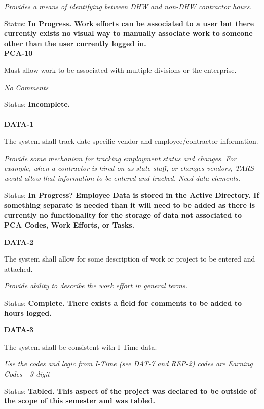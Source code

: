 \noindent \textit{Provides a means of identifying between DHW and non-DHW contractor hours.}

\noindent Status: \textbf{In Progress.   Work efforts can be associated to a user but there currently exists no visual way to manually associate work to someone other than the user currently logged in.}\\


\noindent \textbf{PCA-10}

\noindent Must allow work to be associated with multiple divisions or the enterprise.

\textit{No Comments}

 Status: \textbf{Incomplete.}\\
\\

\noindent \textbf{DATA-1}

\noindent The system shall track date specific vendor and employee/contractor information.

\noindent \textit{Provide some mechanism for tracking employment status and changes. For example, when a contractor is hired on as state staff, or changes vendors, TARS would allow that information to be entered and tracked. Need data elements.}

\noindent Status: \textbf{In Progress?  Employee Data is stored in the Active Directory.  If something separate is needed than it will need to be added as there is currently no functionality for the storage of data not associated to PCA Codes, Work Efforts, or Tasks.}\textit{}

\noindent \textit{}

\noindent \textbf{DATA-2}

\noindent The system shall allow for some description of work or project to be entered and attached.

\textit{Provide ability to describe the work effort in general terms.}

Status: \textbf{Complete.  There exists a field for comments to be added to hours logged.}\textit{}\\

\noindent 

\noindent \textbf{DATA-3}

\noindent The system shall be consistent with I-Time data.

\noindent \textit{Use the codes and logic from I-Time (see DAT-7 and REP-2) codes are Earning Codes - 3 digit}

\noindent Status: \textbf{Tabled.  This aspect of the project was declared to be outside of the scope of this semester and was tabled.}\textit{}\\


